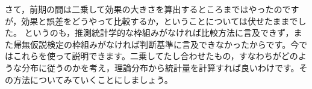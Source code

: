 \documentclass{ltjbook}
\begin{document}
さて，前期の間は二乗して効果の大きさを算出するところまではやったのですが，効果と誤差をどうやって比較するか，ということについては伏せたままでした。
というのも，推測統計学的な枠組みがなければ比較方法に言及できず，また帰無仮説検定の枠組みがなければ判断基準に言及できなかったからです。今ではこれらを使って説明できます。二乗してたし合わせたもの，すなわちがどのような分布に従うのかを考え，理論分布から統計量を計算すれば良いわけです。その方法についてみていくことにしましょう。


\end{document}
